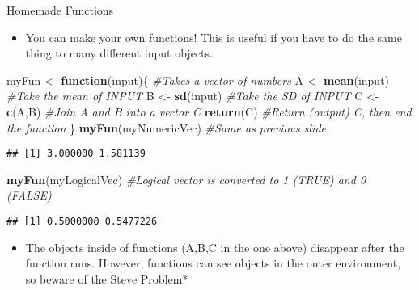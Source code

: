 \documentclass[
  ignorenonframetext,
  aspectratio=169]{beamer}
\newenvironment{Shaded}{\begin{snugshade}}{\end{snugshade}}
\newcommand{\CommentTok}[1]{\textcolor[rgb]{0.56,0.35,0.01}{\textit{#1}}}
\newcommand{\ControlFlowTok}[1]{\textcolor[rgb]{0.13,0.29,0.53}{\textbf{#1}}}
\newcommand{\FunctionTok}[1]{\textcolor[rgb]{0.13,0.29,0.53}{\textbf{#1}}}
\newcommand{\NormalTok}[1]{#1}
\newcommand{\OtherTok}[1]{\textcolor[rgb]{0.56,0.35,0.01}{#1}}
\providecommand{\tightlist}{%
  \setlength{\itemsep}{0pt}\setlength{\parskip}{0pt}}
\begin{document}
\begin{frame}[fragile]{Homemade Functions}
\protect\hypertarget{homemade-functions}{}
\begin{itemize}[<+->]
\tightlist
\item
  You can make your own functions! This is useful if you have to do the
  same thing to many different input objects.
\end{itemize}

\footnotesize

\begin{Shaded}
\begin{Highlighting}[]
\NormalTok{myFun }\OtherTok{\textless{}{-}} \ControlFlowTok{function}\NormalTok{(input)\{ }\CommentTok{\#Takes a vector of numbers}
\NormalTok{  A }\OtherTok{\textless{}{-}} \FunctionTok{mean}\NormalTok{(input) }\CommentTok{\#Take the mean of INPUT}
\NormalTok{  B }\OtherTok{\textless{}{-}} \FunctionTok{sd}\NormalTok{(input) }\CommentTok{\#Take the SD of INPUT}
\NormalTok{  C }\OtherTok{\textless{}{-}} \FunctionTok{c}\NormalTok{(A,B) }\CommentTok{\#Join A and B into a vector C}
  \FunctionTok{return}\NormalTok{(C) }\CommentTok{\#Return (output) C, then end the function}
\NormalTok{\}}
\FunctionTok{myFun}\NormalTok{(myNumericVec) }\CommentTok{\#Same as previous slide}
\end{Highlighting}
\end{Shaded}

\begin{verbatim}
## [1] 3.000000 1.581139
\end{verbatim}

\begin{Shaded}
\begin{Highlighting}[]
\FunctionTok{myFun}\NormalTok{(myLogicalVec) }\CommentTok{\#Logical vector is converted to 1 (TRUE) and 0 (FALSE)}
\end{Highlighting}
\end{Shaded}

\begin{verbatim}
## [1] 0.5000000 0.5477226
\end{verbatim}

\normalsize

\begin{itemize}[<+->]
\tightlist
\item
  The objects inside of functions (A,B,C in the one above) disappear
  after the function runs. However, functions can see objects in the
  outer environment, so beware of the Steve Problem*
\end{itemize}
\end{frame}
\end{document}
